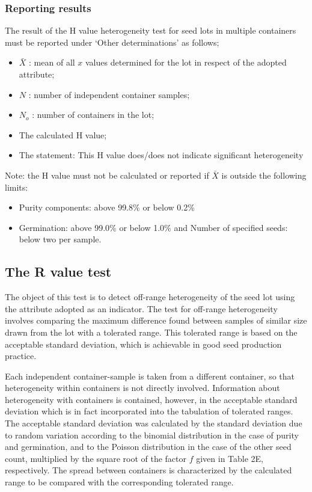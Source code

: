 \documentclass[
]{book}
\providecommand{\tightlist}{%
  \setlength{\itemsep}{0pt}\setlength{\parskip}{0pt}}
\begin{document}
\hypertarget{reporting-results}{%
\subsubsection{Reporting results}\label{reporting-results}}

The result of the H value heterogeneity test for seed lots in multiple containers must be reported under `Other determinations' as follows;

\begin{itemize}
\tightlist
\item
  \(\bar{X}\) : mean of all \(x\) values determined for the lot in respect of the adopted attribute;
\item
  \(N\) : number of independent container samples;
\item
  \(N_o\) : number of containers in the lot;
\item
  The calculated H value;
\item
  The statement: This H value does/does not indicate significant heterogeneity
\end{itemize}

Note: the H value must not be calculated or reported if \(\bar{X}\) is outside the following limits:

\begin{itemize}
\tightlist
\item
  Purity components: above 99.8\% or below 0.2\%
\item
  Germination: above 99.0\% or below 1.0\% and Number of specified seeds: below two per sample.
\end{itemize}

\hypertarget{the-r-value-test}{%
\subsection{The R value test}\label{the-r-value-test}}

The object of this test is to detect off-range heterogeneity of the seed lot using the attribute adopted as an indicator. The test for off-range heterogeneity involves comparing the maximum difference found between samples of similar size drawn from the lot with a tolerated range. This tolerated range is based on the acceptable standard deviation, which is achievable in good seed production practice.

Each independent container-sample is taken from a different container, so that heterogeneity within containers is not directly involved. Information about heterogeneity with containers is contained, however, in the acceptable standard deviation which is in fact incorporated into the tabulation of tolerated ranges. The acceptable standard deviation was calculated by the standard deviation due to random variation according to the binomial distribution in the case of purity and germination, and to the Poisson distribution in the case of the other seed count, multiplied by the square root of the factor \(f\) given in Table 2E, respectively. The spread between containers is characterized by the calculated range to be compared with the corresponding tolerated range.
\end{document}
